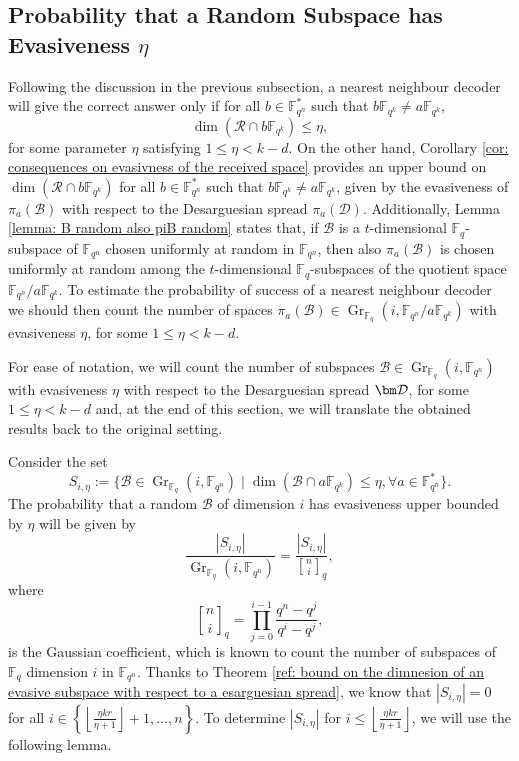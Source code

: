 \documentclass{article}
\newcommand{\F}{\mathbb{F}}
\newcommand{\Fq}{\mathbb{F}_{q}}
\newcommand{\Fqn}{\mathbb{F}_{q^n}}
\newcommand{\Fqk}{\mathbb{F}_{q^k}}
\newcommand{\calB}{\mathcal{B}}
\newcommand{\calD}{\mathcal{D}}
\newcommand{\calR}{\mathcal{R}}
\newcommand{\gbinom}[2]{\genfrac{[}{]}{0pt}{}{#1}{#2}}
\DeclareMathOperator{\Gr}{Gr}
\begin{document}
\subsection{Probability that a Random Subspace has Evasiveness $\eta$}
    Following the discussion in the previous subsection, a nearest neighbour decoder will give the correct answer only if for all 
$b \in \Fqn^*$ such that $b\Fqk \neq a\Fqk$, 
\[
\dim(\calR \cap b\Fqk) \leq \eta,
\]
for some parameter $\eta$ satisfying $1 \leq \eta < k-d$. 
On the other hand, Corollary \ref{cor: consequences on evasivness of the received space} provides an upper bound on $\dim(\calR \cap b\Fqk)$ for all $b \in \Fqn^*$ such that $b\Fqk \neq a\Fqk$, given by the evasiveness of $\pi_a(\calB)$ with respect to the Desarguesian spread $\pi_a(\calD)$.
Additionally, Lemma \ref{lemma: B random also piB random} states that, if $\calB$ is a $t$-dimensional $\Fq$-subspace of $\Fqn$ chosen uniformly at random in $\Fqn$, then also $\pi_a(\calB)$ is chosen uniformly at random among the
$t$-dimensional $\F_q$-subspaces of the quotient space $\Fqn/a\Fqk$. 
To estimate the probability of success of a nearest neighbour decoder we should then count the number of spaces $\pi_a(\calB) \in \Gr_{\Fq}(i,\Fqn/a\Fqk)$ with evasiveness $\eta$, for some $1\leq\eta < k-d.$
\\
\par 
For ease of notation, we will count the number of subspaces $\calB \in \Gr_{\Fq}(i,\Fqn)$ with evasiveness $\eta$ with respect to the Desarguesian spread $\bm \calD$, for some $1 \leq \eta < k-d$ and, at the end of this section, we will translate the obtained results back to the original setting. 
\\
\par Consider the set
    $$
        S_{i,\eta} := \{\calB \in  \Gr_{\Fq}(i,\Fqn) \mid \dim(\calB \cap a \Fqk) \leq \eta, \forall a \in \Fqn^*\}.
    $$
The probability that a random $\calB$ of dimension $i$ has evasiveness upper bounded by $\eta$ will be given by
    $$
        \frac{|S_{i,\eta}|}{\Gr_{\Fq}(i,\Fqn)} = 
        \frac{|S_{i,\eta}|}{\gbinom{n}{i}_q},
    $$
    where 
    $$
        \gbinom{n}{i}_q = \prod_{j = 0}^{i-1} \frac{q^n - q^j}{q^i - q^j},
    $$
is the Gaussian coefficient, which is known to count the number of subspaces of $\Fq$ dimension $i$ in $\Fqn$. Thanks to Theorem \ref{ref: bound on the dimnesion of an evasive subspace with respect to a esarguesian spread}, we know that $|S_{i,\eta}|=0$ for all $i\in\left\{\left\lfloor\frac{\eta kr}{\eta+1}\right\rfloor+1,\ldots,n
\right\}$. To determine $|S_{i,\eta}|$ for $i\leq\left\lfloor\frac{\eta kr}{\eta+1}\right\rfloor$, we will use the following lemma.
\end{document}
